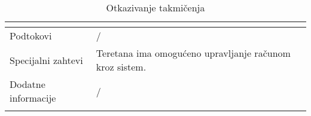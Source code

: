 \documentclass[../../main.tex]{subfiles}
\begin{document}
\begin{longtable}{| p{} | p{} |}
\begin{itemize}
    \end{itemize}\\
\hline
    Podtokovi & /\\
\hline
    Specijalni zahtevi & Teretana ima omogućeno upravljanje računom kroz sistem.\\
\hline
    Dodatne informacije & /\\
\hline
\caption{Otkazivanje takmičenja} %
\end{longtable}
\end{document}
